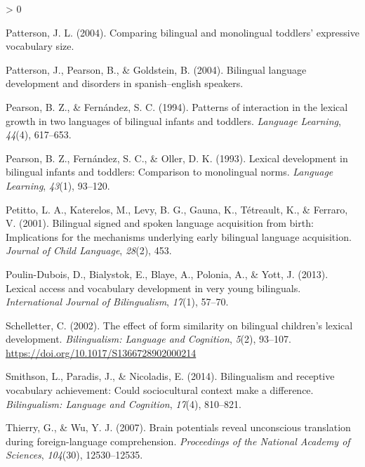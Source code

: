 \documentclass[
  english,
  man,man,floatsintext]{apa6}
\newlength{\cslhangindent}
\newenvironment{CSLReferences}[2] %
 {%
  \setlength{\parindent}{0pt}
  \ifodd #1 \everypar{\setlength{\hangindent}{\cslhangindent}}\ignorespaces\fi
  \ifnum #2 > 0
  \setlength{\parskip}{#2\baselineskip}
  \fi
 }%
 {}
\begin{document}
\begin{CSLReferences}{1}{0}
\leavevmode\hypertarget{ref-patterson2004comparing}{}%
Patterson, J. L. (2004). Comparing bilingual and monolingual toddlers' expressive vocabulary size.

\leavevmode\hypertarget{ref-patterson2004bilingual}{}%
Patterson, J., Pearson, B., \& Goldstein, B. (2004). Bilingual language development and disorders in spanish--english speakers.

\leavevmode\hypertarget{ref-pearson1994patterns}{}%
Pearson, B. Z., \& Fernández, S. C. (1994). Patterns of interaction in the lexical growth in two languages of bilingual infants and toddlers. \emph{Language Learning}, \emph{44}(4), 617--653.

\leavevmode\hypertarget{ref-pearson1993lexical}{}%
Pearson, B. Z., Fernández, S. C., \& Oller, D. K. (1993). Lexical development in bilingual infants and toddlers: Comparison to monolingual norms. \emph{Language Learning}, \emph{43}(1), 93--120.

\leavevmode\hypertarget{ref-petitto2001bilingual}{}%
Petitto, L. A., Katerelos, M., Levy, B. G., Gauna, K., Tétreault, K., \& Ferraro, V. (2001). Bilingual signed and spoken language acquisition from birth: Implications for the mechanisms underlying early bilingual language acquisition. \emph{Journal of Child Language}, \emph{28}(2), 453.

\leavevmode\hypertarget{ref-poulin2013lexical}{}%
Poulin-Dubois, D., Bialystok, E., Blaye, A., Polonia, A., \& Yott, J. (2013). Lexical access and vocabulary development in very young bilinguals. \emph{International Journal of Bilingualism}, \emph{17}(1), 57--70.

\leavevmode\hypertarget{ref-schelletter2002effect}{}%
Schelletter, C. (2002). The effect of form similarity on bilingual children's lexical development. \emph{Bilingualism: Language and Cognition}, \emph{5}(2), 93--107. \url{https://doi.org/10.1017/S1366728902000214}

\leavevmode\hypertarget{ref-smithson2014bilingualism}{}%
Smithson, L., Paradis, J., \& Nicoladis, E. (2014). Bilingualism and receptive vocabulary achievement: Could sociocultural context make a difference. \emph{Bilingualism: Language and Cognition}, \emph{17}(4), 810--821.

\leavevmode\hypertarget{ref-thierry2007brain}{}%
Thierry, G., \& Wu, Y. J. (2007). Brain potentials reveal unconscious translation during foreign-language comprehension. \emph{Proceedings of the National Academy of Sciences}, \emph{104}(30), 12530--12535.


\end{CSLReferences}
\end{document}
